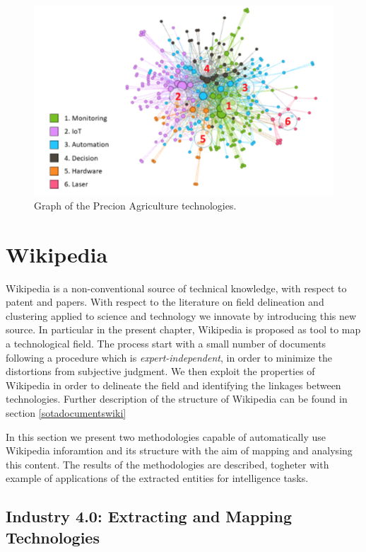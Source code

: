 \documentclass[]{book}
\begin{document}
\begin{figure}

{\centering \includegraphics[width=0.8\linewidth]{_bookdown_files/figures/precisiongraph} 

}

\caption{Graph of the Precion Agriculture technologies.}\label{fig:precisiongraph}
\end{figure}

\chapter{Wikipedia}\label{wikipedia}

Wikipedia is a non-conventional source of technical knowledge, with
respect to patent and papers. With respect to the literature on field
delineation and clustering applied to science and technology we innovate
by introducing this new source. In particular in the present chapter,
Wikipedia is proposed as tool to map a technological field. The process
start with a small number of documents following a procedure which is
\emph{expert-independent}, in order to minimize the distortions from
subjective judgment. We then exploit the properties of Wikipedia in
order to delineate the field and identifying the linkages between
technologies. Further description of the structure of Wikipedia can be
found in section \ref{sotadocumentswiki}

In this section we present two methodologies capable of automatically
use Wikipedia inforamtion and its structure with the aim of mapping and
analysing this content. The results of the methodologies are described,
togheter with example of applications of the extracted entities for
intelligence tasks.

\section{Industry 4.0: Extracting and Mapping
Technologies}\label{technimetrochap}
\end{document}
